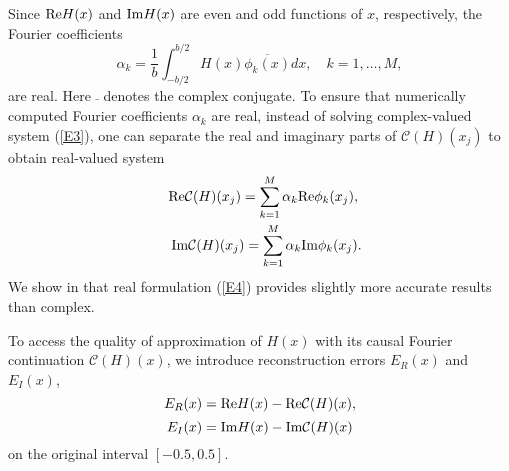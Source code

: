 \documentclass[journal,twoside]{IEEEtran}
\begin{document}
Since ${\mathop{\rm Re}\nolimits} H(x)$ and ${\mathop{\rm Im}\nolimits} H(x)$ are even and odd functions of $x$, respectively, the Fourier coefficients 
\[
\alpha_k=\frac{1}{b}\int_{-b/2}^{b/2} H(x) \overline{\phi_k(x)}dx, \quad k=1,\ldots, M,
\]
are real. Here 
$\bar{ \  }$ denotes the complex conjugate. 
To ensure that  numerically computed Fourier coefficients $\alpha_k$ are real, instead of solving complex-valued system (\ref{E3}), one  can separate the real and imaginary parts of ${\mathcal C}(H)(x_j)$ to obtain real-valued system
\begin{equation} \label{E4}
\begin{array}{l}
\displaystyle
\phantom{-}
{\mathop{\rm Re}\nolimits}{\mathcal C}(H)(x_j)=\sum_{k=1}^{M}  \alpha_{k}   {\mathop{\rm Re}\nolimits}\phi_k(x_j), \\[13pt]
\displaystyle
\hspace{10pt}
{\mathop{\rm Im}\nolimits}{\mathcal C}(H)(x_j)=\sum_{k=1}^{M}  \alpha_{k} {\mathop{\rm Im}\nolimits}\phi_k(x_j).
\end{array}
\end{equation}
We show in \cite{Barannyk_Aboutaleb_Elshabini_Barlow_IEEE} that real formulation (\ref{E4}) provides slightly more accurate results than complex.

To access the quality of approximation of $H(x)$ with its causal Fourier continuation ${\mathcal C}(H)(x)$, we introduce reconstruction errors $E_R(x)$ and $E_I(x)$, 
\begin{equation} \label{error_Re}
E_R(x)={\mathop{\rm Re}\nolimits} H(x) - {\mathop{\rm Re}\nolimits}{\mathcal C}(H)(x),
\end{equation}
\begin{equation}\label{error_Im}
E_I(x)={\mathop{\rm Im}\nolimits} H(x) - {\mathop{\rm Im}\nolimits}{\mathcal C}(H)(x)
\end{equation}
on the original interval $[-0.5,0.5]$. 
\end{document}

